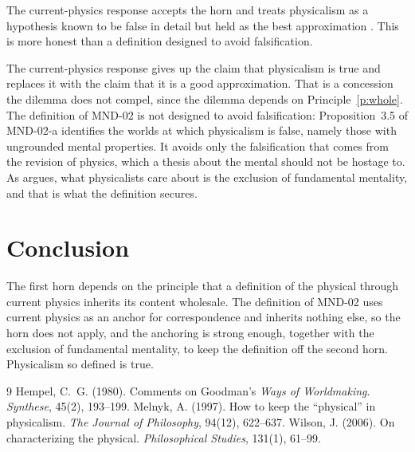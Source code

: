 \documentclass{situationist-preprint}
\begin{document}
\begin{objection}
The current-physics response accepts the horn and treats physicalism as a hypothesis known to be false in detail but held as the best approximation \citep{Melnyk1997}. This is more honest than a definition designed to avoid falsification.
\end{objection}

\begin{reply}
The current-physics response gives up the claim that physicalism is true and replaces it with the claim that it is a good approximation. That is a concession the dilemma does not compel, since the dilemma depends on Principle~\ref{p:whole}. The definition of MND-02 is not designed to avoid falsification: Proposition~3.5 of MND-02-a identifies the worlds at which physicalism is false, namely those with ungrounded mental properties. It avoids only the falsification that comes from the revision of physics, which a thesis about the mental should not be hostage to. As \citet{Wilson2006} argues, what physicalists care about is the exclusion of fundamental mentality, and that is what the definition secures.
\end{reply}

\section{Conclusion}

The first horn depends on the principle that a definition of the physical through current physics inherits its content wholesale. The definition of MND-02 uses current physics as an anchor for correspondence and inherits nothing else, so the horn does not apply, and the anchoring is strong enough, together with the exclusion of fundamental mentality, to keep the definition off the second horn. Physicalism so defined is true.

\begin{thebibliography}{9}\small
{} Hempel, C.~G. (1980). Comments on Goodman's \emph{Ways of Worldmaking}. \emph{Synthese}, 45(2), 193--199.
 Melnyk, A. (1997). How to keep the \enquote{physical} in physicalism. \emph{The Journal of Philosophy}, 94(12), 622--637.
 Wilson, J. (2006). On characterizing the physical. \emph{Philosophical Studies}, 131(1), 61--99.
\end{thebibliography}
\end{document}

